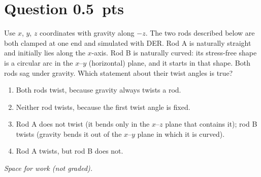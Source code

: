 \documentclass[letterpaper,11pt]{article}
\newcounter{qnum}
\newcommand{\qpts}{0.5}
\newcommand{\mcq}[5]{%
  \clearpage
  \stepcounter{qnum}%
  \section*{Question \theqnum \hfill \normalsize \qpts~pts}
  #1
  \begin{enumerate}[label=(\alph*)]
    \item #2
    \item #3
    \item #4
    \item #5
  \end{enumerate}
  \vspace{3mm}

  \textit{Space for work (not graded).}
}
\begin{document}
%
%
\mcq{Use $x$, $y$, $z$ coordinates with gravity along $-z$. The two rods described below are both clamped at one end and simulated with DER. Rod A is naturally straight and initially lies along the $x$-axis. Rod B is naturally curved: its stress-free shape is a circular arc in the $x$--$y$ (horizontal) plane, and it starts in that shape. Both rods sag under gravity. Which statement about their twist angles is true?}
  {Both rods twist, because gravity always twists a rod.}
  {Neither rod twists, because the first twist angle is fixed.}
  {Rod A does not twist (it bends only in the $x$--$z$ plane that contains it); rod B twists (gravity bends it out of the $x$--$y$ plane in which it is curved).}
  {Rod A twists, but rod B does not.}
\end{document}
